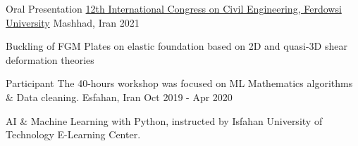 

\begin{cventries}
  \cventry
{Oral Presentation} %
{\href{} {12th International Congress on Civil Engineering, Ferdowsi University}} %
{Mashhad, Iran} %
{2021} %
{
	\begin{cvitems} %
		\item {Buckling of FGM Plates on elastic foundation based on 2D and quasi-3D shear deformation theories}
	\end{cvitems}
}
\vspace{10pt}
  \cventry
       {Participant} %
        {{The 40-hours workshop was focused on ML Mathematics algorithms \& Data cleaning.}} %
    {Esfahan, Iran} %
    {Oct 2019 - Apr 2020} %
    {
      \begin{cvitems} %
        \item {AI \& Machine Learning with Python, instructed by Isfahan University of Technology E-Learning Center.}
              \end{cvitems}
    }

\end{cventries}
